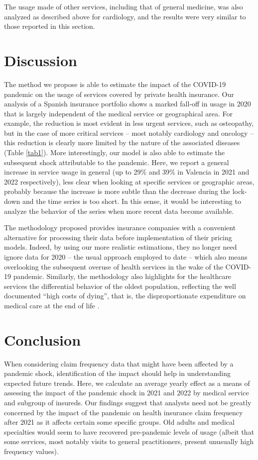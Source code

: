 \documentclass[]{risa}
\begin{document}
The usage made of other services, including that of general medicine, was also analyzed as described above for cardiology, and the results were very similar to those reported in this section.


\section{Discussion}\label{discussion}
The method we propose is able to estimate the impact of the COVID-19 pandemic on the usage of services covered by private health insurance. Our analysis of a Spanish insurance portfolio shows a marked fall-off in usage in 2020 that is largely independent of the medical service or geographical area. For example, the reduction is most evident in less urgent services, such as osteopathy, but in the case of more critical services – most notably cardiology and oncology – this reduction is clearly more limited by the nature of the associated diseases (Table \ref{tab1}). More interestingly, our model is also able to estimate the subsequent shock attributable to the pandemic. Here, we report a general increase in service usage in general (up to 29\% and 39\% in Valencia in 2021 and 2022 respectively), less clear when looking at specific services or geographic areas, probably because the increase is more subtle than the decrease during the lock-down and the time series is too short. In this sense, it would be interesting to analyze the behavior of the series when more recent data become available. 

The methodology proposed provides insurance companies with a convenient alternative for processing their data before implementation of their pricing models. Indeed, by using our more realistic estimations, they no longer need ignore data for 2020 – the usual approach employed to date – which also means overlooking the subsequent overuse of health services in the wake of the COVID-19 pandemic. Similarly, the methodology also highlights for the healthcare services the differential behavior of the oldest population, reflecting the well documented “high costs of dying”, that is, the disproportionate expenditure on medical care at the end of life  \cite{lubitz_use_1984, scitovsky_high_2005}. 

\section{Conclusion}
When considering claim frequency data that might have been affected by a pandemic shock, identification of the impact should help in understanding expected future trends. Here, we calculate an average yearly effect as a means of assessing the impact of the pandemic shock in 2021 and 2022 by medical service and subgroup of insureds. Our findings suggest that analysts need not be greatly concerned by the impact of the pandemic on health insurance claim frequency after 2021 as it affects certain  some specific groups. Old adults and medical specialties would seem to have recovered pre-pandemic levels of usage (albeit that some services, most notably visits to general practitioners, present unusually high frequency values). 
\end{document}
